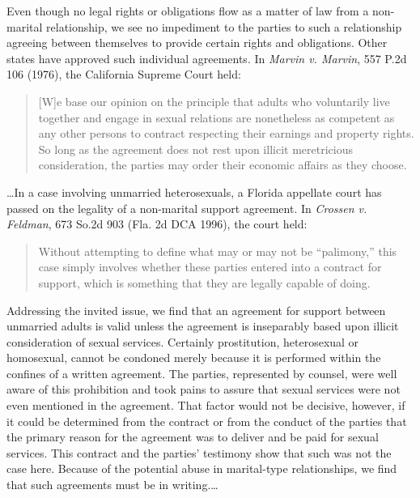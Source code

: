 Even though no legal rights or obligations flow as a matter of law from a
non-marital relationship, we see no impediment to the parties to such a
relationship agreeing between themselves to provide certain rights and
obligations. Other states have approved such individual agreements. In
\emph{Marvin v. Marvin}, 557 P.2d 106 (1976), the California Supreme Court held:
\begin{quote}
[W]e base our opinion on the principle that adults who voluntarily live together
and engage in sexual relations are nonetheless as competent as any other
persons to contract respecting their earnings and property rights. So long as
the agreement does not rest upon illicit meretricious consideration, the
parties may order their economic affairs as they choose.
\end{quote}
\dots In a case involving unmarried heterosexuals, a Florida appellate court
has passed on the legality of a non-marital support agreement. In \emph{Crossen
v. Feldman}, 673 So.2d 903 (Fla. 2d DCA 1996), the court held:
\begin{quote}
Without attempting to define what may or may not be ``palimony,'' this case simply
involves whether these parties entered into a contract for support, which is
something that they are legally capable of doing.
\end{quote}

Addressing the invited issue, we find that an agreement for support between
unmarried adults is valid unless the agreement is inseparably based upon
illicit consideration of sexual services. Certainly prostitution, heterosexual
or homosexual, cannot be condoned merely because it is performed within the
confines of a written agreement. The parties, represented by counsel, were well
aware of this prohibition and took pains to assure that sexual services were
not even mentioned in the agreement. That factor would not be decisive,
however, if it could be determined from the contract or from the conduct of the
parties that the primary reason for the agreement was to deliver and be paid
for sexual services. This contract and the parties' testimony show that such
was not the case here. Because of the potential abuse in marital-type
relationships, we find that such agreements must be in writing.\dots

